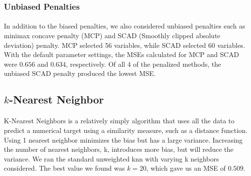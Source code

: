 \documentclass[paper=a4, fontsize=11pt]{scrartcl} %
\numberwithin{equation}{section} %
\numberwithin{figure}{section} %
\numberwithin{table}{section} %
\begin{document}
\subsubsection{Unbiased Penalties}
\paragraph{}
In addition to the biased penalties, we also considered unbiased penalties such as minimax concave penalty (MCP) and SCAD (Smoothly clipped absolute deviation) penalty. MCP selected 56 variables, while SCAD selected 60 variables. With the default parameter settings, the
MSEs calculated for MCP and SCAD were \(0.656\) and \(0.634\), respectively. Of all 4 of the penalized methods, the unbiased SCAD penalty produced the lowest MSE.


\subsection{\(k\)-Nearest Neighbor}
\paragraph{}
 K-Nearest Neighbors is a relatively simply algorithm that uses all the data to predict a numerical target using a similarity measure, such as a distance function. Using 1 nearest neighbor minimizes the bias but has a large variance. Increasing the number of nearest neighbors, k, introduces more bias, but will reduce the variance. 
We ran the standard unweighted knn with varying k neighbors considered. The best value we found was \(k=20\), which gave us an MSE of \(0.509\).
\end{document}
